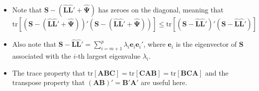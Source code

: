 \documentclass[
  letterpaper,
  DIV=11,
  numbers=noendperiod]{scrartcl}
\providecommand{\tightlist}{%
  \setlength{\itemsep}{0pt}\setlength{\parskip}{0pt}}\usepackage{longtable,booktabs,array}
\begin{document}
\begin{itemize}
\tightlist
\item
  Note that
  \(\symbf{S}-(\hat{\symbf{L}}\hat{\symbf{L}}' + \hat{\symbf{\Psi}})\)
  has zeroes on the diagonal, meaning that
  \(\mathrm{tr}[(\symbf{S}-(\hat{\symbf{L}}\hat{\symbf{L}}' + \hat{\symbf{\Psi}}))'(\symbf{S}-(\hat{\symbf{L}}\hat{\symbf{L}}' + \hat{\symbf{\Psi}}))]\leq \mathrm{tr}[(\symbf{S}-\hat{\symbf{L}}\hat{\symbf{L}}')'(\symbf{S}-\hat{\symbf{L}}\hat{\symbf{L}}')]\)
\item
  Also note that
  \(\symbf{S}-\hat{\symbf{L}}\hat{\symbf{L}}'=\sum_{i=m+1}^p\lambda_i\symbf{e}_i\symbf{e}_i'\),
  where \(\symbf{e}_i\) is the eigenvector of \(\symbf{S}\) associated
  with the \(i\)-th largest eigenvalue \(\lambda_i\).
\item
  The trace property that
  \(\mathrm{tr}[\symbf{A}\symbf{B}\symbf{C}]=\mathrm{tr}[\symbf{C}\symbf{A}\symbf{B}]=\mathrm{tr}[\symbf{B}\symbf{C}\symbf{A}]\)
  and the transpose property that
  \((\symbf{A}\symbf{B})'=\symbf{B}'\symbf{A}'\) are useful here.
\end{itemize}
\end{document}
